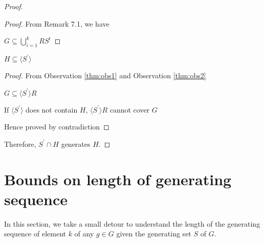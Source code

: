\begin{proof}
\begin{proof}
From Remark 7.1, we have 

$G \subseteq \bigcup\limits_{i=1}^k RS^t $

\end{proof}


\begin{proposition}
$H \subseteq \langle S^\prime \rangle $
\end{proposition}

\begin{proof}
From Observation \ref{thm:obs1} and Observation \ref{thm:obs2}

$G \subseteq \langle S^\prime \rangle R $ 

If $\langle S^\prime \rangle$ does not contain $H$,
$\langle S^\prime \rangle R $ cannot cover $G$

Hence proved by contradiction

\end{proof}
Therefore, $S^\prime \cap H$ generates $H$.

\end{proof}





\section{Bounds on length of generating sequence}
In this section, we take a small detour to 
understand the length of the generating sequence of
element $k$ of any $g \in G$ given the generating set $S$ of $G$.

